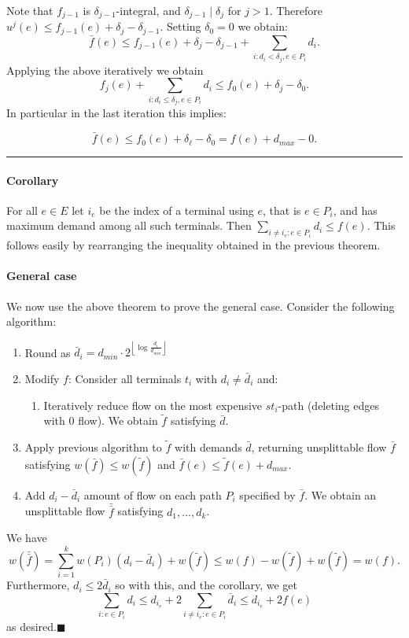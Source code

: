 \documentclass[letterpaper,12pt,oneside,onecolumn]{article}
\newenvironment{proof}{{\bf Proof:  }}{\hfill\rule{2mm}{2mm}}
\newcommand{\floor}[1]{\ensuremath{\left\lfloor#1\right\rfloor}}
\begin{document}
\begin{proof}
\paragraph{}Note that $f_{j-1}$ is $\delta_{j-1}$-integral, and $\delta_{j-1}\mid \delta_j$ for $j > 1$. Therefore $u^j(e) \leq f_{j-1}(e) + \delta_j - \delta_{j-1}$.
Setting $\delta_0 = 0$ we obtain:
$$\bar{f}(e) \leq f_{j-1}(e) + \delta_j - \delta_{j-1} + \sum_{i:d_i < \delta_j, e\in P_i} d_i.$$
Applying the above iteratively we obtain
$$f_j(e) + \sum_{i:d_i\leq \delta_j, e\in P_i} d_i \leq f_0(e) + \delta_j - \delta_0.$$
In particular in the last iteration this implies:

$$\bar{f}(e) \leq f_0(e) + \delta_\ell - \delta_0 = f(e) + d_{max} - 0.$$

\end{proof}
\paragraph{Corollary}
For all $e\in E$ let $i_e$ be the index of a terminal using $e$, that is $e \in P_i$, and has maximum demand among all such terminals. Then $\sum_{i\neq i_e : e \in P_i} d_i \leq f(e)$. This follows easily by rearranging the inequality obtained in the previous theorem.
\paragraph{General case}
We now use the above theorem to prove the general case. Consider the following algorithm:
\begin{enumerate}
\item Round as $\bar{d}_i = d_{min}\cdot 2^{\floor{\log \frac{d_i}{d_{min}}}}$
\item Modify $f$: Consider all terminals $t_i$ with $d_i \neq \bar{d}_i$ and:
\begin{enumerate}
\item Iteratively reduce flow on the most expensive $st_i$-path (deleting edges with $0$ flow). We obtain $\tilde{f}$ satisfying $\bar{d}$.
\end{enumerate}
\item Apply previous algorithm to $\tilde{f}$ with demands $\bar{d}$, returning unsplittable flow $\bar{f}$ satisfying $w(\bar{f}) \leq w(\tilde{f})$ and $\bar{f}(e) \leq \tilde{f}(e) + d_{max}$.
\item Add $d_i - \bar{d}_i$ amount of flow on each path $P_i$ specified by $\bar{f}$. We obtain an unsplittable flow $\bar{\bar{f}}$ satisfying $d_1,\dots,d_k$.
\end{enumerate}
We have $$w(\bar{\bar{f}}) = \sum_{i=1}^k w(P_i)(d_i -\bar{d}_i) + w(\tilde{f}) \leq w(f) - w(\tilde{f}) + w(\tilde{f}) = w(f).$$
Furthermore, $d_i \leq 2 \bar{d}_i$ so with this, and the corollary, we get 
$$\sum_{i: e\in P_i} d_i \leq d_{i_e} + 2\sum_{i\neq i_e : e\in P_i} \bar{d}_i \leq d_{i_e} + 2f(e)$$
as desired.$\blacksquare$
\end{document}
